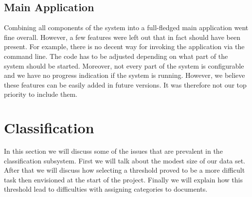 \subsection{Main Application}
Combining all components of the system into a full-fledged main application went fine overall. However, a few features were left out that in fact should have been present. For example, there is no decent way for invoking the application via the command line. The code has to be adjusted depending on what part of the system should be started. Moreover, not every part of the system is configurable and we have no progress indication if the system is running. However, we believe these features can be easily added in future versions. It was therefore not our top priority to include them.



\section{Classification} \label{sec:discuss-classifier}
In this section we will discuss some of the issues that are prevalent in the classification subsystem. First we will talk about the modest size of our data set. After that we will discuss how selecting a threshold proved to be a more difficult task then envisioned at the start of the project. Finally we will explain how this threshold lead to difficulties with assigning categories to documents.\\

